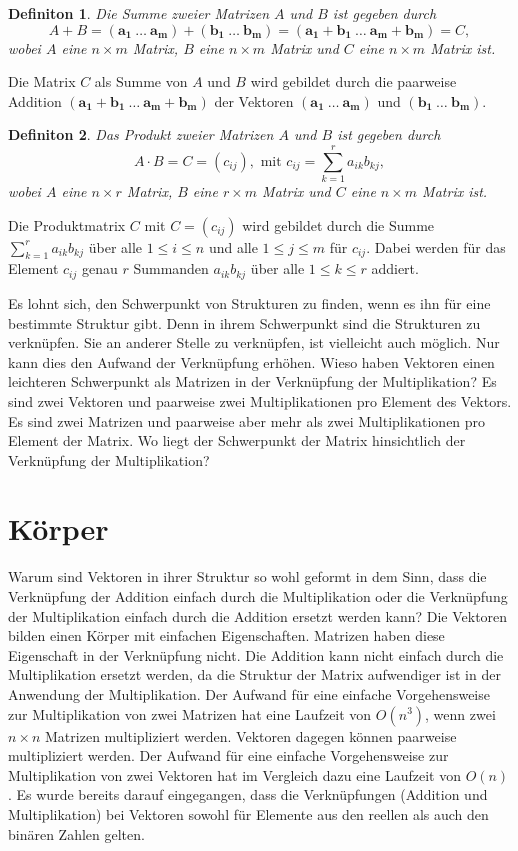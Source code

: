 \documentclass[oneside]{scrbook}
\newtheorem{definition}{Definiton}[section]
\numberwithin{equation}{section}
\begin{document}
\begin{definition}
	Die Summe zweier Matrizen $A$ und $B$ ist gegeben durch 
	$$A + B = (\boldsymbol{a_1} \: \ldots \: \boldsymbol{a_m}) + (\boldsymbol{b_1} \: \ldots \: \boldsymbol{b_m}) = (\boldsymbol{a_1} + \boldsymbol{b_1} \: \ldots \: \boldsymbol{a_m} + \boldsymbol{b_m}) = C,$$ wobei $A$ eine $n \times m$ Matrix, $B$ eine $n \times m$ Matrix und $C$ eine $n \times m$ Matrix ist.
\end{definition}
Die Matrix $C$ als Summe von $A$ und $B$ wird gebildet durch die paarweise Addition $(\boldsymbol{a_1} + \boldsymbol{b_1} \: \ldots \: \boldsymbol{a_m} + \boldsymbol{b_m})$ der Vektoren $(\boldsymbol{a_1} \: \ldots \: \boldsymbol{a_m})$ und $(\boldsymbol{b_1} \: \ldots \: \boldsymbol{b_m})$.
\begin{definition}
	Das Produkt zweier Matrizen $A$ und $B$ ist gegeben durch 
	$$A \cdot B = C = (c_{ij}), \text{ mit } c_{ij} = \sum_{k=1}^{r}a_{ik}b_{kj},$$ wobei $A$ eine $n \times r$ Matrix, $B$ eine $r \times m$ Matrix und $C$ eine $n \times m$ Matrix ist.
\end{definition}
Die Produktmatrix $C$ mit $C = (c_{ij})$ wird gebildet durch die Summe $\sum_{k=1}^{r}a_{ik}b_{kj}$ über alle $1 \leq i \leq n$ und alle $1 \leq j \leq m$ für $c_{ij}$. Dabei werden für das Element $c_{ij}$ genau $r$ Summanden $a_{ik}b_{kj}$ über alle $1 \leq k \leq r$ addiert.

Es lohnt sich, den Schwerpunkt von Strukturen zu finden, wenn es ihn für eine bestimmte Struktur gibt. Denn in ihrem Schwerpunkt sind die Strukturen zu verknüpfen. Sie an anderer Stelle zu verknüpfen, ist vielleicht auch möglich. Nur kann dies den Aufwand der Verknüpfung erhöhen. Wieso haben Vektoren einen leichteren Schwerpunkt als Matrizen in der Verknüpfung der Multiplikation? Es sind zwei Vektoren und paarweise zwei Multiplikationen pro Element des Vektors. Es sind zwei Matrizen und paarweise aber mehr als zwei Multiplikationen pro Element der Matrix. Wo liegt der Schwerpunkt der Matrix hinsichtlich der Verknüpfung der Multiplikation?

\section{Körper}
Warum sind Vektoren in ihrer Struktur so wohl geformt in dem Sinn, dass die Verknüpfung der Addition einfach durch die Multiplikation oder die Verknüpfung der Multiplikation einfach durch die Addition ersetzt werden kann? Die Vektoren bilden einen Körper mit einfachen Eigenschaften. Matrizen haben diese Eigenschaft in der Verknüpfung nicht. Die Addition kann nicht einfach durch die Multiplikation ersetzt werden, da die Struktur der Matrix aufwendiger ist in der Anwendung der Multiplikation. Der Aufwand für eine einfache Vorgehensweise zur Multiplikation von zwei Matrizen hat eine Laufzeit von $O(n^3)$, wenn zwei $n \times n$ Matrizen multipliziert werden. Vektoren dagegen können paarweise multipliziert werden. Der Aufwand für eine einfache Vorgehensweise zur Multiplikation von zwei Vektoren hat im Vergleich dazu eine Laufzeit von $O(n)$. Es wurde bereits darauf eingegangen, dass die Verknüpfungen (Addition und Multiplikation) bei Vektoren sowohl für Elemente aus den reellen als auch den binären Zahlen gelten.
\end{document}
